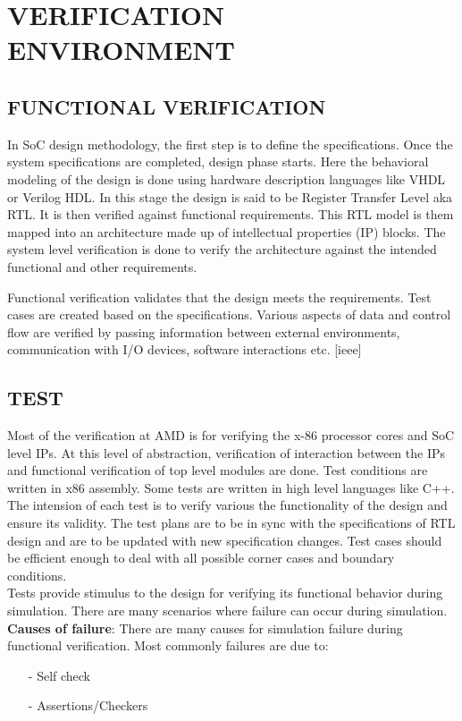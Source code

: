 \chapter{VERIFICATION ENVIRONMENT}
\label{chap:verification.tex}

\section {FUNCTIONAL VERIFICATION}

In SoC design methodology, the first step is to define the specifications. Once the system specifications are completed, design phase starts. Here the behavioral modeling of the design is done using hardware description languages like VHDL or Verilog HDL.  In this  stage the design is said to be Register Transfer Level aka RTL. It is then verified against functional requirements.  This RTL model is them mapped into an architecture made up of intellectual properties (IP) blocks. The system level verification is done to verify the architecture against the intended functional and other requirements. 



Functional verification validates that the design meets the requirements. Test cases are created based on the specifications. Various aspects of data and control flow are verified by passing information between external environments, communication with I/O devices,  software interactions etc. [ieee]

 
\section {TEST}

Most of the verification at AMD is for verifying the x-86 processor cores and SoC level IPs. At this level of abstraction, verification of interaction between the IPs and functional verification of top level modules are done.  Test conditions are written in x86 assembly. Some tests are written in high level languages like C++. The intension of each test is to verify various the functionality of the design and ensure its validity. The test plans are to be in sync with the specifications of RTL design and are to be updated with new specification changes. Test cases should be efficient enough to deal with all possible corner cases and boundary conditions. \\
Tests provide stimulus to the design for verifying its functional behavior during simulation. There are many scenarios where failure can occur during simulation. \\    
{\bf Causes of failure}: There are many causes for simulation failure during functional verification.  Most commonly failures are due to:
\begin{itemize}
	\item[-] Self check 
	\item[-] Assertions/Checkers
\end{itemize}



